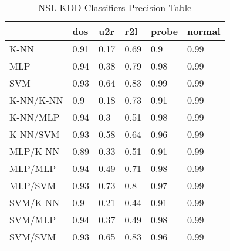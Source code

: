 \begin{table}[H]
\centering
\caption{NSL-KDD Classifiers Precision Table}
\label{nslprecisiontable}
\begin{tabular}{@{}llllll@{}}
\toprule
 & dos & u2r & r2l & probe & normal \\ \midrule
K-NN & 0.91 & 0.17 & 0.69 & 0.9 & 0.99 \\
MLP & 0.94 & 0.38 & 0.79 & 0.98 & 0.99 \\
SVM & 0.93 & 0.64 & 0.83 & 0.99 & 0.99 \\
K-NN/K-NN & 0.9 & 0.18 & 0.73 & 0.91 & 0.99 \\
K-NN/MLP & 0.94 & 0.3 & 0.51 & 0.98 & 0.99 \\
K-NN/SVM & 0.93 & 0.58 & 0.64 & 0.96 & 0.99 \\
MLP/K-NN & 0.89 & 0.33 & 0.51 & 0.91 & 0.99 \\
MLP/MLP & 0.94 & 0.49 & 0.71 & 0.98 & 0.99 \\
MLP/SVM & 0.93 & 0.73 & 0.8 & 0.97 & 0.99 \\
SVM/K-NN & 0.9 & 0.21 & 0.44 & 0.91 & 0.99 \\
SVM/MLP & 0.94 & 0.37 & 0.49 & 0.98 & 0.99 \\
SVM/SVM & 0.93 & 0.65 & 0.83 & 0.96 & 0.99 \\ \bottomrule
\end{tabular}
\end{table}

